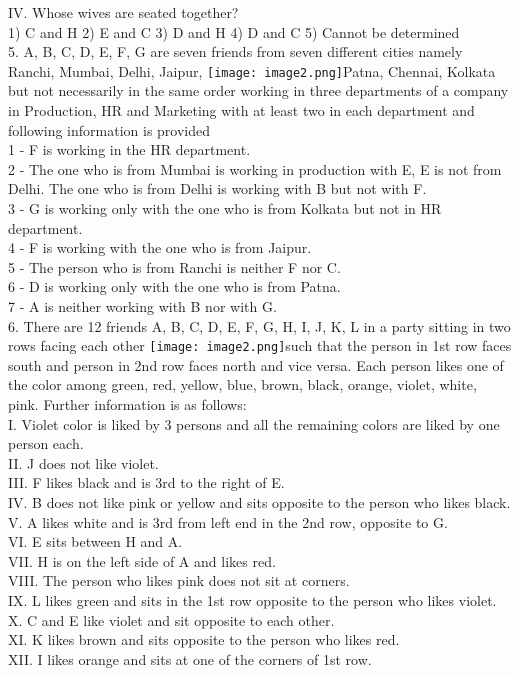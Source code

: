 \documentclass[
]{article}
\begin{document}
IV. Whose wives are seated together?\\
1) C and H \hspace{2mm}2) E and C \hspace{2mm}3) D and H \hspace{2mm}4) D and C \hspace{2mm}5) Cannot be determined\\

5. A, B, C, D, E, F, G are seven friends from seven different cities namely Ranchi, Mumbai,
Delhi, Jaipur, \texttt{[image: image2.png]}Patna, Chennai, Kolkata but not necessarily in the same order working in
three departments of a company in Production, HR and Marketing with at least two in each
department and following information is provided\\
1 - F is working in the HR department.\\
2 - The one who is from Mumbai is working in production with E, E is not from Delhi. The
one who is from Delhi is working with B but not with F.\\
3 - G is working only with the one who is from Kolkata but not in HR department.\\
4 - F is working with the one who is from Jaipur.\\
5 - The person who is from Ranchi is neither F nor C.\\
6 - D is working only with the one who is from Patna.\\
7 - A is neither working with B nor with G.\\

6. There are 12 friends A, B, C, D, E, F, G, H, I, J, K, L in a party sitting in two rows facing each
other \texttt{[image: image2.png]}such that the person in 1st row faces south and person in 2nd row faces north and vice
versa. Each person likes one of the color among green, red, yellow, blue, brown, black,
orange, violet, white, pink. Further information is as follows:\\
I. Violet color is liked by 3 persons and all the remaining colors are liked by one person
each.\\
II. J does not like violet.\\
III. F likes black and is 3rd to the right of E.\\
IV. B does not like pink or yellow and sits opposite to the person who likes black.\\
V. A likes white and is 3rd from left end in the 2nd row, opposite to G.\\
VI. E sits between H and A.\\
VII. H is on the left side of A and likes red.\\
VIII. The person who likes pink does not sit at corners.\\
IX. L likes green and sits in the 1st row opposite to the person who likes violet.\\
X. C and E like violet and sit opposite to each other.\\
XI. K likes brown and sits opposite to the person who likes red.\\
XII. I likes orange and sits at one of the corners of 1st row.\\
\end{document}
